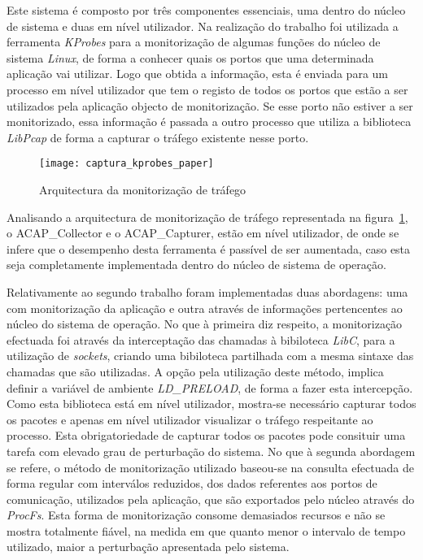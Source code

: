Este sistema é composto por três componentes essenciais, uma dentro do núcleo de sistema e duas em nível utilizador.
Na realização do trabalho foi utilizada a ferramenta \textit{KProbes} para a monitorização de algumas funções do núcleo de sistema \textit{Linux}, de forma a conhecer quais os portos que uma determinada aplicação vai utilizar.
Logo que obtida a informação, esta é enviada para um processo em nível utilizador que tem o registo de todos os portos que estão a ser utilizados pela aplicação objecto de monitorização.
Se esse porto não estiver a ser monitorizado, essa informação é passada a outro processo que utiliza a biblioteca \textit{LibPcap} de forma a capturar o tráfego existente nesse porto.


\begin{figure}[h!]
       \centering
       \texttt{[image: captura\_kprobes\_paper]}
       \caption{Arquitectura da monitorização de tráfego}
	\label{fig:paper_capture_kprobes}
\end{figure}


Analisando a arquitectura de monitorização de tráfego representada na figura~\ref{fig:paper_capture_kprobes}, o ACAP\_Collector e o ACAP\_Capturer, estão em nível utilizador, de onde se infere que o desempenho desta ferramenta é passível de ser aumentada, caso esta seja completamente implementada dentro do núcleo de sistema de operação.

Relativamente ao segundo trabalho foram implementadas duas abordagens: uma com monitorização da aplicação e outra através de informações pertencentes ao núcleo do sistema de operação.
No que à primeira diz respeito, a monitorização efectuada foi através da interceptação das chamadas à bibiloteca \textit{LibC}, para a utilização de \textit{sockets}, criando uma bibiloteca partilhada com a mesma sintaxe das chamadas que são utilizadas.
A opção pela utilização deste método, implica definir a variável de ambiente \textit{LD\_PRELOAD}, de forma a fazer esta intercepção.
Como esta biblioteca está em nível utilizador, mostra-se necessário capturar todos os pacotes e apenas em nível utilizador visualizar o tráfego respeitante ao processo.
Esta obrigatoriedade de capturar todos os pacotes pode consituir uma tarefa com elevado grau de perturbação do sistema.
No que à segunda abordagem se refere, o método de monitorização utilizado baseou-se na consulta efectuada de forma regular com interválos reduzidos, dos dados referentes aos portos de comunicação, utilizados pela aplicação, que são exportados pelo núcleo através do \textit{ProcFs}.
Esta forma de monitorização consome demasiados recursos e não se mostra totalmente fiável, na medida em que quanto menor o intervalo de tempo utilizado, maior a perturbação apresentada pelo sistema.

